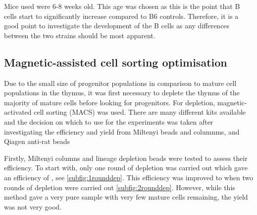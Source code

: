 

Mice used were 6-8 weeks old.
This age was chosen as this is the point that B cells start to significantly increase compared to B6 controls.
Therefore, it is a good point to investigate the development of the B cells as any differences between the two strains should be most apparent.



\subsection{Magnetic-assisted cell sorting optimisation}

Due to the small size of progenitor populations in comparison to mature cell populations in the thymus, it was first necessary to deplete the thymus of the majority of mature cells before looking for progenitors.
For depletion, magnetic-activated cell sorting (MACS) was used.
There are many different kits available and the decision on which to use for the experiments was taken after investigating the efficiency and yield from Miltenyi beads and columnms, and Qiagen anti-rat beads 

Firstly, Miltenyi columns and lineage depletion beads were tested to assess their efficiency.
To start with, only one round of depletion was carried out which gave an efficiency of , see \cref{subfig:1rounddep}.
This efficiency was improved to  when two rounds of depletion were carried out \cref{subfig:2rounddep}. 
However, while this method gave a very pure sample with very few mature cells remaining, the yield was not very good.

